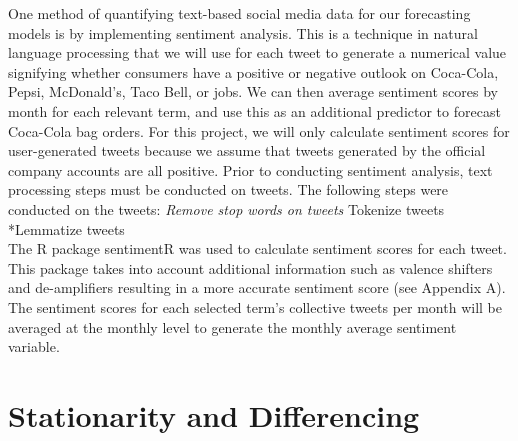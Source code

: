 \documentclass[12pt,oneside]{chicagocapstone}
\begin{document}
One method of quantifying text-based social media data for our
forecasting models is by implementing sentiment analysis. This is a
technique in natural language processing that we will use for each tweet
to generate a numerical value signifying whether consumers have a
positive or negative outlook on Coca-Cola, Pepsi, McDonald's, Taco Bell,
or jobs. We can then average sentiment scores by month for each relevant
term, and use this as an additional predictor to forecast Coca-Cola bag
orders. For this project, we will only calculate sentiment scores for
user-generated tweets because we assume that tweets generated by the
official company accounts are all positive. Prior to conducting
sentiment analysis, text processing steps must be conducted on tweets.
The following steps were conducted on the tweets: \emph{Remove stop
words on tweets }Tokenize tweets *Lemmatize tweets\\
The R package sentimentR was used to calculate sentiment scores for each
tweet. This package takes into account additional information such as
valence shifters and de-amplifiers resulting in a more accurate
sentiment score (see Appendix A). The sentiment scores for each selected
term's collective tweets per month will be averaged at the monthly level
to generate the monthly average sentiment variable.

\section*{Stationarity and
Differencing}\label{stationarity-and-differencing}
\end{document}
